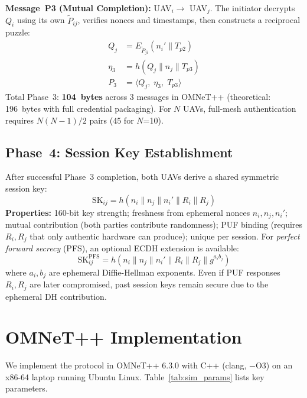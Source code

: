 \documentclass[conference]{IEEEtran}
\begin{document}
\textbf{Message~P3 (Mutual Completion):} UAV$_i \to$ UAV$_j$. The initiator decrypts $Q_i$ using its own $\tilde{P}_{ij}$, verifies nonces and timestamps, then constructs a reciprocal puzzle:
\begin{align}
Q_j &= E_{\tilde{P}_{ji}}(n_i' \| T_{p2}) \label{eq:puzzle_j}\\
\eta_3 &= h(Q_j \| n_j \| T_{p3}) \label{eq:p3_mac}\\
P_3 &= \langle Q_j,\; \eta_3,\; T_{p3} \rangle \label{eq:p3}
\end{align}
Total Phase~3: \textbf{104~bytes} across 3 messages in OMNeT++ (theoretical: 196~bytes with full credential packaging). For $N$ UAVs, full-mesh authentication requires $N(N{-}1)/2$ pairs (45 for $N$=10).

\subsection{Phase~4: Session Key Establishment}
After successful Phase~3 completion, both UAVs derive a shared symmetric session key:
\begin{equation}
\text{SK}_{ij} = h(n_i \| n_j \| n_i' \| R_i \| R_j)
\label{eq:sk}
\end{equation}
\textbf{Properties:} 160-bit key strength; freshness from ephemeral nonces $n_i, n_j, n_i'$; mutual contribution (both parties contribute randomness); PUF binding (requires $R_i, R_j$ that only authentic hardware can produce); unique per session. For \emph{perfect forward secrecy} (PFS), an optional ECDH extension is available:
\begin{equation}
\text{SK}_{ij}^{\text{PFS}} = h(n_i \| n_j \| n_i' \| R_i \| R_j \| g^{a_i b_j})
\label{eq:sk_pfs}
\end{equation}
where $a_i, b_j$ are ephemeral Diffie-Hellman exponents. Even if PUF responses $R_i, R_j$ are later compromised, past session keys remain secure due to the ephemeral DH contribution.

\section{OMNeT++ Implementation}
\label{sec:implementation}

We implement the protocol in OMNeT++ 6.3.0 with C++ (clang, $-$O3) on an x86-64 laptop running Ubuntu Linux. Table~\ref{tab:sim_params} lists key parameters.
\end{document}
